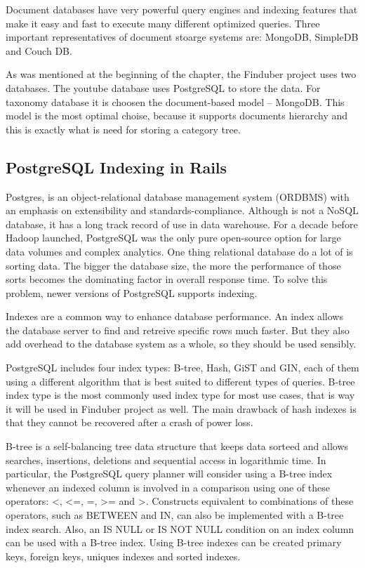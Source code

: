 Document databases have very powerful query engines and indexing features that make it easy and fast to execute many different optimized queries. \cite{mongodb-adv} Three important representatives of document stoarge systems are: MongoDB, SimpleDB and Couch DB. 

As was mentioned at the beginning of the chapter, the Finduber project uses two databases. The youtube database uses PostgreSQL to store the data. For taxonomy database it is choosen the document-based model -- MongoDB. This model is the most optimal choise, because it supports documents hierarchy and this is exactly what is need for storing a category tree.

\subsection{PostgreSQL Indexing in Rails}

Postgres, is an object-relational database management system (ORDBMS) with an emphasis on extensibility and standards-compliance. Although is not a NoSQL database, it has a long track record of use in data warehouse. For a decade before Hadoop launched, PostgreSQL was the only pure open-source option for large data volumes and complex analytics. One thing relational database do a lot of is sorting data. The bigger the database size, the more the performance of those sorts becomes the dominating factor in overall response time.\cite{whypostgres} To solve this problem, newer versions of PostgreSQL supports indexing. 

Indexes are a common way to enhance database performance. An index allows the database server to find and retreive specific rows much faster. But they also add overhead to the database system as a whole, so they should be used sensibly.

PostgreSQL includes four index types: B-tree, Hash, GiST and GIN, each of them using a different algorithm that is best suited to different types of queries. B-tree index type is the most commonly used index type for most use cases, that is way it will be used in Finduber project as well. The main drawback of hash indexes is that they cannot be recovered after a crash of power loss. 

B-tree is a self-balancing tree data structure that keeps data sorteed and allows searches, insertions, deletions and sequential access in logarithmic time. In particular, the PostgreSQL query planner will consider using a B-tree index whenever an indexed column is involved in a comparison using one of these operators: \textless, <=, =, >= and \textgreater. Constructs equivalent to combinations of these operators, such as BETWEEN and IN, can also be implemented with a B-tree index search. Also, an IS NULL or IS NOT NULL condition on an index column can be used with a B-tree index.\cite{postgresweb} Using B-tree indexes can be created primary keys, foreign keys, uniques indexes and sorted indexes. 

